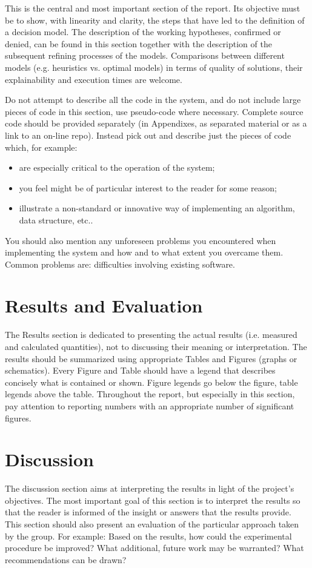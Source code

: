This is the central and most important section of the report. Its objective must be to show, with linearity and clarity, the steps that have led to the definition of a decision model. The description of the working hypotheses, confirmed or denied, can be found in this section together with the description of the subsequent refining processes of the models. Comparisons between different models (e.g. heuristics vs. optimal models) in terms of quality of solutions, their explainability and execution times are welcome. 

Do not attempt to describe all the code in the system, and do not include large pieces of code in this section, use pseudo-code where necessary. Complete source code should be provided separately (in Appendixes, as separated material or as a link to an on-line repo). Instead pick out and describe just the pieces of code which, for example:
\begin{itemize}
\item are especially critical to the operation of the system;
\item you feel might be of particular interest to the reader for some reason;
\item  illustrate a non-standard or innovative way of implementing an algorithm, data
structure, etc..
\end{itemize}

You should also mention any unforeseen problems you encountered when implementing the
system and how and to what extent you overcame them. Common problems are:
 difficulties involving existing software.


\section{Results and Evaluation}
The Results section is dedicated to presenting the actual results (i.e. measured and calculated quantities), not to discussing their meaning or interpretation. The results should be summarized using appropriate Tables and Figures (graphs or schematics). Every Figure and Table should have a legend that describes concisely what is contained or shown. Figure legends go below the figure, table legends above the table. Throughout the report, but especially in this section, pay attention to reporting numbers with an appropriate number of significant figures. 

\section{Discussion}
The discussion section aims at interpreting the results in light of the project's objectives. The most important goal of this section is to interpret the results so that the reader is informed of the insight or answers that the results provide. This section should also present an evaluation of the particular approach taken by the group. For example: Based on the results, how could the experimental procedure be improved? What additional, future work may be warranted? What recommendations can be drawn?


